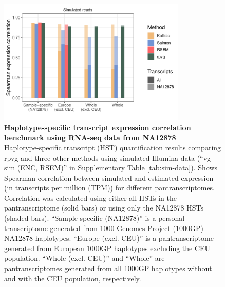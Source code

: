 \documentclass[11pt]{ucthesis}
\begin{document}
\begin{figure}[H]
\ssp
\begin{center}
\includegraphics[width=0.8\textwidth]{mpmapfigures/figureS6.pdf}
\caption{\textbf{Haplotype-specific transcript expression correlation benchmark using RNA-seq data from NA12878} \\
Haplotype-specific transcript (HST) quantification results comparing rpvg and three other methods using simulated Illumina data (``vg sim (ENC, RSEM)'' in Supplementary Table \ref{tab:sim-data}). Shows Spearman correlation between simulated and estimated expression (in transcripts per million (TPM)) for different pantranscriptomes. Correlation was calculated using either all HSTs in the pantranscriptome (solid bars) or using only the NA12878 HSTs (shaded bars). ``Sample-specific (NA12878)'' is a personal transcriptome generated from 1000 Genomes Project (1000GP) NA12878 haplotypes. ``Europe (excl. CEU)'' is a pantranscriptome generated from European 1000GP haplotypes excluding the CEU population. ``Whole (excl. CEU)'' and ``Whole'' are pantranscriptomes generated from all 1000GP haplotypes without and with the CEU population, respectively. 
} \label{fig:expression-corr}
\end{center}
\end{figure}
\end{document}
